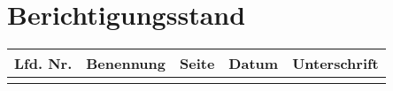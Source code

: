 \chapter*{Berichtigungsstand}
\begin{tabular}{|c|c|c|c|c|}
\hline
Lfd. Nr. & Benennung & Seite & Datum & Unterschrift\\
\hline
\parbox[0pt][33em][c]{0cm}{} & \parbox[0pt][3em][c]{0cm}{} & \parbox[0pt][3em][c]{0cm}{} & \parbox[0pt][3em][c]{0cm}{} & \parbox[0pt][3em][c]{0cm}{} \\
\hline

\end{tabular}